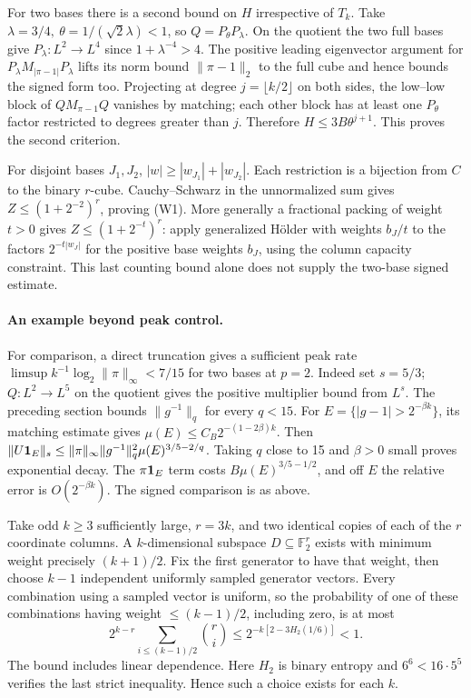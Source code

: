 For two bases there is a second bound on \(H\) irrespective of \(T_k\).
Take \(\lambda=3/4,\ \theta=1/(\sqrt2\lambda)<1\), so
\(Q=P_\theta P_\lambda\). On the quotient the two full bases give
\(P_\lambda:L^2\to L^4\) since \(1+\lambda^{-4}>4\).
The positive leading eigenvector argument for
\(P_\lambda M_{|\pi-1|}P_\lambda\) lifts its norm bound
\(\|\pi-1\|_2\) to the full cube and hence bounds the signed form too.
Projecting at degree \(j=\lfloor k/2\rfloor\) on both sides, the
low--low block of \(QM_{\pi-1}Q\) vanishes by matching; each other block
has at least one \(P_\theta\) factor restricted to degrees greater than
\(j\). Therefore \(H\le3B\theta^{j+1}\). This proves the second criterion.

For disjoint bases \(J_1,J_2\), \(|w|\ge |w_{J_1}|+|w_{J_2}|\).
Each restriction is a bijection from \(C\) to the binary \(r\)-cube.
Cauchy--Schwarz in the unnormalized sum gives
\(Z\le(1+2^{-2})^r\), proving (W1). More generally a fractional packing
of weight \(t>0\) gives \(Z\le(1+2^{-t})^r\): apply generalized
H\"older with weights \(b_J/t\) to the factors \(2^{-t|w_J|}\) for the
positive base weights \(b_J\), using the column capacity constraint.
This last counting bound alone does not supply the two-base signed estimate.

\paragraph{An example beyond peak control.}
For comparison, a direct truncation gives a sufficient peak rate
\(\limsup k^{-1}\log_2\|\pi\|_\infty<7/15\) for two bases at \(p=2\).
Indeed set \(s=5/3\); \(Q:L^2\to L^5\) on the quotient gives the
positive multiplier bound from \(L^s\). The preceding section bounds
\(\|g^{-1}\|_q\) for every \(q<15\).
For \(E=\{|g-1|>2^{-\beta k}\}\), its matching estimate gives
\(\mu(E)\le C_B 2^{-(1-2\beta)k}\).
Then \(\|U{\bf1}_E\|_s\le \|\pi\|_\infty\|g^{-1}\|_q^2
\mu(E)^{3/5-2/q}\). Taking \(q\) close to 15 and \(\beta>0\) small
proves exponential decay. The \(\pi{\bf1}_E\) term costs
\(B\mu(E)^{3/5-1/2}\), and off \(E\) the relative error is
\(O(2^{-\beta k})\). The signed comparison is as above.

Take odd \(k\ge3\) sufficiently large, \(r=3k\), and two identical
copies of each of the \(r\) coordinate columns. A \(k\)-dimensional
subspace \(D\subseteq\mathbb F_2^r\) exists with minimum weight precisely
\((k+1)/2\). Fix the first generator to have that weight, then choose
\(k-1\) independent uniformly sampled generator vectors. Every combination
using a sampled vector is uniform, so the probability of one of these
combinations having weight \(\le(k-1)/2\), including zero, is at most
\[
 2^{k-r}\sum_{i\le(k-1)/2}\binom ri
 \le 2^{-k[2-3H_2(1/6)]}<1 .
\]
The bound includes linear dependence. Here \(H_2\) is binary entropy and
\(6^6<16\cdot5^5\) verifies the last strict inequality. Hence such a choice
exists for each \(k\).

